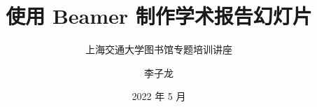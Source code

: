 \documentclass{ctexbeamer}
\begin{document}
    \title{使用 Beamer 制作学术报告幻灯片}
    \subtitle{上海交通大学图书馆专题培训讲座}
    \author{李子龙}
    \date{2022 年 5 月}
    \maketitle
\end{document}
